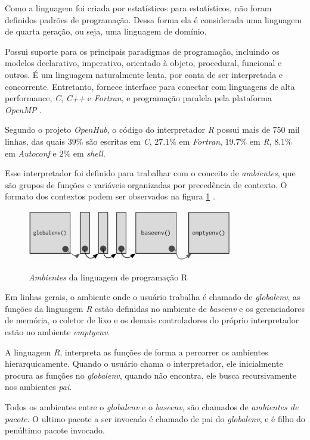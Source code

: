 Como a linguagem foi criada por estatísticos para estatísticos, não foram definidos padrões de programação. Dessa forma ela é considerada uma linguagem de quarta geração, ou seja, uma linguagem de domínio.

Possui suporte para os principais paradigmas de programação, incluindo os modelos  declarativo, imperativo, orientado à objeto, procedural, funcional e outros. É um linguagem naturalmente lenta, por conta de ser interpretada e concorrente. Entretanto, fornece interface para conectar com linguagens de alta performance, \textit{C}, \textit{C++} e \textit{Fortran}, e programação paralela pela plataforma \textit{OpenMP} .

Segundo o projeto \textit{OpenHub}, o código do interpretador \textit{R} possui mais de 750 mil linhas, das quais $39\%$ são escritas em \textit{C}, $27.1\%$ em \textit{Fortran}, $19.7\%$ em \textit{R}, $8.1\%$ em \textit{Autoconf} e $2\%$ em \textit{shell}. 

Esse interpretador foi definido para trabalhar com o conceito de \textit{ambientes}, que são grupos de funções e variáveis organizadas por precedência de contexto. O formato dos contextos podem ser observados na figura \ref{fig:R_Envs} .

\begin{figure}[!htb]
	\centering
	\caption{\textit{Ambientes} da linguagem de programação R}
	\includegraphics[width=0.8\textwidth]{./04-figuras/R-envs}
	\label{fig:R_Envs}
\end{figure}

Em linhas gerais, o ambiente onde o usuário trabalha é chamado de \textit{globalenv}, as funções da linguagem \textit{R} estão definidas no ambiente de \textit{baseenv} e os gerenciadores de memória, o coletor de lixo e os demais controladores do próprio interpretador estão no ambiente \textit{emptyenv}.

A linguagem \textit{R}, interpreta as funções de forma a percorrer os ambientes hierarquicamente. Quando o usuário chama o interpretador, ele inicialmente procura as funções no \textit{globalenv}, quando não encontra, ele busca recursivamente nos ambientes \textit{pai}.

Todos os ambientes entre o \textit{globalenv} e o \textit{baseenv}, são chamados de \textit{ambientes de pacote}. 
O ultimo pacote a ser invocado é chamado de pai do \textit{globalenv}, e é filho do penúltimo pacote invocado. 

